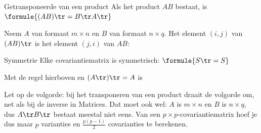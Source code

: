 \begin{theorie}
\begin{stelling}{Getransponeerde van een product}
Als het product $AB$ bestaat, is \qquad $\formule{(AB)\tr = B\tr A\tr}$
\end{stelling}

\begin{bewijs}
Neem $A$ van formaat $m \times n$ en $B$ van formaat $n \times q$. Het element $(i, j)$ van $(AB)\tr$ is het element $(j, i)$ van $AB$:
\end{bewijs}

\begin{stelling}{Symmetrie}
Elke covariantiematrix is symmetrisch: \qquad $\formule{S\tr = S}$
\end{stelling}

\begin{bewijs}
Met de regel hierboven en $(A\tr)\tr = A$ is
\end{bewijs}
\end{theorie}

Let op de volgorde: bij het transponeren van een product draait de volgorde om, net als bij de inverse in Matrices. Dat moet ook wel: $A$ is $m \times n$ en $B$ is $n \times q$, dus $A\tr B\tr$ bestaat meestal niet eens. Van een $p \times p$-covariantiematrix hoef je dus maar $p$ varianties en $\frac{p(p - 1)}{2}$ covarianties te berekenen.


